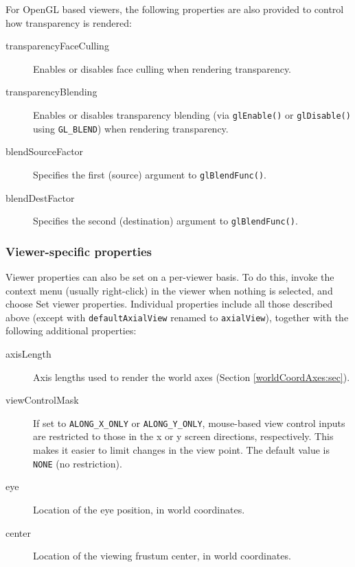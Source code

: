 \documentclass{article}
\begin{document}
For OpenGL based viewers, the following properties are also provided
to control how transparency is rendered:

\begin{description}

\item[transparencyFaceCulling]\mbox{}

Enables or disables face culling when rendering transparency.

\item[transparencyBlending]\mbox{}

Enables or disables transparency blending (via {\tt glEnable()} or
{\tt glDisable()} using {\tt GL\_BLEND}) when rendering transparency.

\item[blendSourceFactor]\mbox{}

Specifies the first (source) argument to {\tt glBlendFunc()}.

\item[blendDestFactor]\mbox{}

Specifies the second (destination) argument to {\tt glBlendFunc()}.

\end{description}

\subsubsection{Viewer-specific properties}
\label{ViewerSpecificProps:sec}

Viewer properties can also be set on a per-viewer basis. To do this,
invoke the context menu (usually right-click) in the viewer when
nothing is selected, and choose {\sf Set viewer properties}.
Individual properties include all those described above (except with
{\tt defaultAxialView} renamed to {\tt axialView}), together with the
following additional properties:

\begin{description}

\item[axisLength]\mbox{}

Axis lengths used to render the world axes (Section
\ref{worldCoordAxes:sec}).

\item[viewControlMask]\mbox{}

If set to {\tt ALONG\_X\_ONLY} or {\tt ALONG\_Y\_ONLY}, mouse-based
view control inputs are restricted to those in the x or y screen
directions, respectively. This makes it easier to limit changes in the
view point. The default value is {\tt NONE} (no restriction).

\item[eye]\mbox{}

Location of the eye position, in world coordinates.

\item[center]\mbox{}

Location of the viewing frustum center, in world coordinates.

\end{description}
\end{document}
